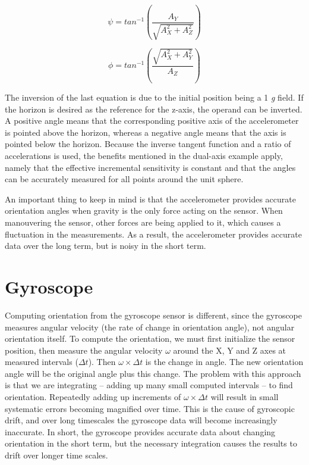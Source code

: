  \begin{equation}	
 	\psi=tan^{-1}(\frac{A_{Y}}{\sqrt{A_{X}^{2}+A_{Z}^{2}}})
 \end{equation}
 
 \begin{equation}	
 	\phi=tan^{-1}(\frac{\sqrt{A_{X}^{2}+A_{Y}^{2}}}{A_{Z}})
 \end{equation}
 
The inversion of the last equation is due to the initial position being a 1 \textit{g} field. If the horizon is desired as the reference for the z-axis, the operand can be inverted. A positive angle means that the corresponding positive axis of the accelerometer is pointed above the horizon, whereas a negative angle means that the axis is pointed below the horizon. Because the inverse tangent function and a ratio of accelerations is used, the benefits mentioned in the dual-axis example apply, namely that the effective incremental sensitivity is constant and that the angles can be accurately measured for all points around the unit sphere.

An important thing to keep in mind is that the accelerometer provides accurate orientation angles when gravity is the only force acting on the sensor. When manouvering the sensor, other forces are being applied to it, which causes a fluctuation in the measurements. As a result, the accelerometer provides accurate data over the long term, but is noisy in the short term\cite{AccelCite2}.

\section{Gyroscope}
Computing orientation from the gyroscope sensor is different, since the gyroscope measures angular velocity (the rate of change in orientation angle), not angular orientation itself. To compute the orientation, we must first initialize the sensor position, then measure the angular velocity $\omega$ around the X, Y and Z axes at measured intervals ($\Delta t$).   Then $\omega \times \Delta t$ is the change in angle. The new orientation angle will be the original angle plus this change. The problem with this approach is that we are integrating – adding up many small computed intervals – to find orientation.  Repeatedly adding up increments of  $\omega \times \Delta t$ will result in small systematic errors becoming magnified over time. This is the cause of gyroscopic drift, and over long timescales the gyroscope data will become increasingly inaccurate. In short, the gyroscope provides accurate data about changing orientation in the short term, but the necessary integration causes the results to drift over longer time scales.

